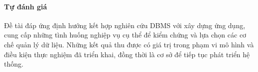 \paragraph*{Tự đánh giá}

Đề tài đáp ứng định hướng kết hợp nghiên cứu DBMS với xây dựng ứng dụng, cung cấp những tình huống nghiệp vụ cụ thể để kiểm chứng và lựa chọn các cơ chế quản lý dữ liệu. Những kết quả thu được có giá trị trong phạm vi mô hình và điều kiện thực nghiệm đã triển khai, đồng thời là cơ sở để tiếp tục phát triển hệ thống.
